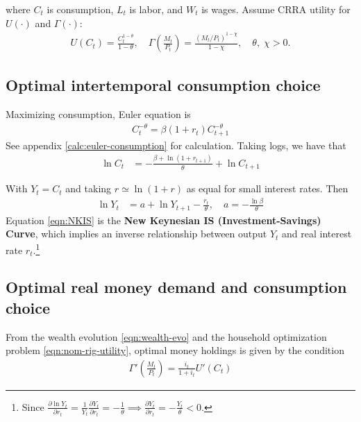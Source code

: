 \documentclass[../main.tex]{subfiles}
\begin{document}
        where $C_t$ is consumption, $L_t$ is labor, and $W_t$ is wages. Assume CRRA utility for $U(\cdot)$ and $\Gamma(\cdot)$:
        \begin{align}
            U(C_t) = \frac{C_t^{1-\theta}}{1-\theta},
            \quad
            \Gamma\left(\frac{M_t}{P_t}\right) = \frac{(M_t/P_t)^{1-\chi}}{1-\chi},
            \quad \theta,\; \chi > 0.
        \end{align}
        
    \subsection{Optimal intertemporal consumption choice}
    
        Maximizing consumption, Euler equation is
        \begin{align}
            C_t^{-\theta} = \beta (1+r_t) C_{t+1}^{-\theta}
            \label{eqn:euler-consumption}
        \end{align}
        See appendix \eqref{calc:euler-consumption} for calculation.
        Taking logs, we have that
        \begin{align}
            \ln C_t &= -\frac{\beta + \ln(1+r_{t+1})}{\theta} + \ln C_{t+1}
        \end{align}
        
        With $Y_t = C_t$ and taking $r \simeq \ln(1+r)$ as equal for small interest rates. Then
        \begin{align}
            \ln Y_t &= a + \ln Y_{t+1} - \frac{r_t}{\theta},
            \quad
            a = -\frac{\ln \beta}{\theta}
            \label{eqn:NKIS}
        \end{align}
        Equation \eqref{eqn:NKIS} is the \textbf{New Keynesian IS (Investment-Savings) Curve}, which implies an inverse relationship between output $Y_t$ and real interest rate $r_t$.\footnote{Since $\frac{\partial \ln Y_t}{\partial r_t} = \frac{1}{Y_t} \frac{\partial Y_t}{\partial r_t}
            = - \frac{1}{\theta} \implies
            \frac{\partial Y_t}{\partial r_t} = -\frac{Y_t}{\theta} < 0.$}
            
    \subsection{Optimal real money demand and consumption choice}
        From the wealth evolution \eqref{eqn:wealth-evo} and the household optimization problem \eqref{eqn:nom-rig-utility}, optimal money holdings is given by the condition
        \begin{align}
            \Gamma'\left(\frac{M_t}{P_t}\right)
            = \frac{i_t}{1+i_t}U'(C_t)
        \end{align}
        
\end{document}
